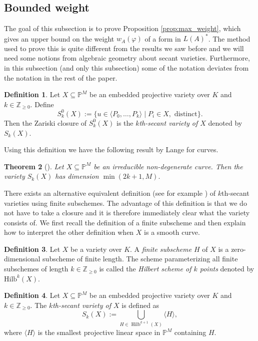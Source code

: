 \documentclass[12pt]{amsart}
\renewcommand{\geq}{\geqslant}
\newcommand{\Z}{\mathbb{Z}}
\newtheorem{theorem}{Theorem}[section]
\theoremstyle{definition}
\newtheorem{definition}[theorem]{Definition}
\begin{document}
	\subsection{Bounded weight}
	The goal of this subsection is to prove Proposition \ref{prop:max_weight}, which gives an upper bound on the weight $w_A(\varphi)$ of a form in $L(A)^\ast$. The method used to prove this is quite different from the results we saw before and we will need some notions from algebraic geometry about secant varieties. Furthermore, in this subsection (and only this subsection) some of the notation deviates from the notation in the rest of the paper.
	
	\begin{definition}
		Let $X \subseteq \mathbb{P}^M$ be an embedded projective variety over $K$ and $k \in \Z_{\geq 0}$. Define 
		$$S_k^0(X) := \{ u \in \langle P_0, \ldots, P_k \rangle \mid P_i \in X, \text{ distinct} \}.$$ 
		Then the Zariski closure of $S_k^0(X)$ is the \textit{$k$th-secant variety of $X$} denoted by $S_k(X)$. 
	\end{definition}
	
	Using this definition we have the following result by Lange for curves.
	
	\begin{theorem}[{\cite{Lange1984Secants}}]\label{Thm:secantk}
		Let $X \subseteq \mathbb P^M$ be an irreducible non-degenerate curve. Then the variety $S_k(X)$ has dimension $\min(2k + 1, M).$ 
	\end{theorem} 
	
	There exists an alternative equivalent definition (see for example \cite[Propostion 6.8]{Buczynski2017FinSchemesSecantVar}) of $k$th-secant varieties using finite subschemes. The advantage of this definition is that we do not have to take a closure and it is therefore immediately clear what the variety consists of. We first recall the definition of a finite subscheme and then explain how to interpret the other definition when $X$ is a smooth curve. 
	
	\begin{definition}
		Let $X$ be a variety over $K$. A \textit{finite subscheme} $H$ of $X$ is a zero-dimensional subscheme of finite length. The scheme parameterizing all finite subschemes of length $k \in \Z_{\geq0}$ is called the \textit{Hilbert scheme of $k$ points} denoted by $\text{Hilb}^{k}(X)$. 
	\end{definition}
	
	\begin{definition}
		Let $X \subseteq \mathbb P^M$ be an embedded projective variety over $K$ and $k \in \Z_{\geq 0}$. The \textit{$k$th-secant variety of $X$} is defined as  
		$$S_k(X) := \bigcup_{H \in \operatorname{Hilb}^{k+1}(X)} \langle H \rangle,$$
		where $\langle H \rangle$ is the smallest projective linear space in $\mathbb P^M$ containing $H$.
	\end{definition}
	
\end{document}
